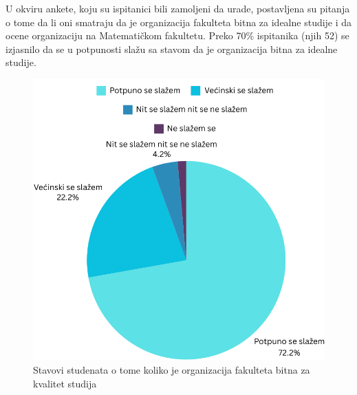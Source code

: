 \documentclass[a4paper]{article}
\begin{document}
U okviru ankete, koju su ispitanici bili zamoljeni da urade, postavljena su pitanja o tome da li oni smatraju da je organizacija fakulteta bitna za idealne studije i da ocene
organizaciju na Matematičkom fakultetu. Preko 70\% ispitanika (njih 52) se izjasnilo da se u potpunosti slažu sa stavom da je organizacija bitna za idealne studije.\\
\begin{figure}[h!]
\begin{center}
    \includegraphics[scale = 0.3]{PieChartOrganizacija.png}
    \caption{Stavovi studenata o tome koliko je organizacija fakulteta bitna za kvalitet studija}
    \label{fig:organizacija}
\end{center}
\end{figure}
\end{document}
